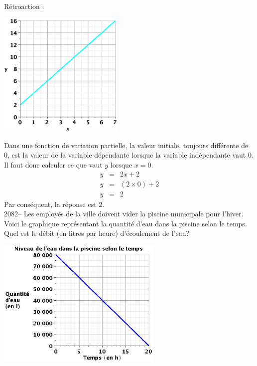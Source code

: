 \documentclass[letterpaper, 12pt]{article}
\begin{document}
R\'etroaction :\\
\begin{center}
 \includegraphics[width=6cm,bb=20 118 575 673]{Q2081.eps}
\end{center}
Dans une fonction de variation partielle, la valeur initiale, toujours diff\'erente de 0, est la valeur de la variable d\'ependante lorsque la variable ind\'ependante vaut 0. Il faut donc calculer ce que vaut $y$ lorsque $x=0$.
\begin{eqnarray*}
 y &=& 2x + 2 \\
 y &=& (2 \times 0) + 2 \\
 y &=& 2
\end{eqnarray*}
Par cons\'equent, la r\'eponse est 2.\\

2082-- Les employ\'es de la ville doivent vider la piscine municipale pour l'hiver. Voici le graphique repr\'esentant la quantit\'e d'eau dans la piscine selon le temps. Quel est le d\'ebit (en litres par heure) d'\'ecoulement de l'eau?\\
\begin{center}
 \includegraphics[width=8cm,bb=14 14 529 415]{Q2082v.eps}
\end{center}
\end{document}
